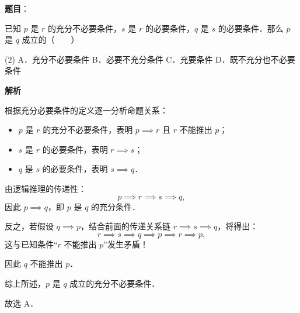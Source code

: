 \begin{answer}

\textbf{题目}：

已知 $p$ 是 $r$ 的充分不必要条件，$s$ 是 $r$ 的必要条件，$q$ 是 $s$ 的必要条件．那么 $p$ 是 $q$ 成立的\mbox{（　　）}

\begin{gkopts}(2)
\task A．充分不必要条件
\task B．必要不充分条件
\task C．充要条件
\task D．既不充分也不必要条件
\end{gkopts}

\textbf{解析}

根据充分必要条件的定义逐一分析命题关系：
\begin{itemize}
\item $p$ 是 $r$ 的充分不必要条件，表明 $p \implies r$ 且 $r$ 不能推出 $p$；
\item $s$ 是 $r$ 的必要条件，表明 $r \implies s$；
\item $q$ 是 $s$ 的必要条件，表明 $s \implies q$．
\end{itemize}

由逻辑推理的传递性：
\nopagebreak[4]
\[
p \implies r \implies s \implies q,
\]
因此 $p \implies q$，即 $p$ 是 $q$ 的充分条件．

反之，若假设 $q \implies p$，结合前面的传递关系链 $r \implies s \implies q$，将得出：
\nopagebreak[4]
\[
r \implies s \implies q \implies p \implies r \implies p,
\]
这与已知条件“$r$ 不能推出 $p$”发生矛盾！

因此 $q$ 不能推出 $p$．

综上所述，$p$ 是 $q$ 成立的充分不必要条件．

故选 A．


\end{answer}
